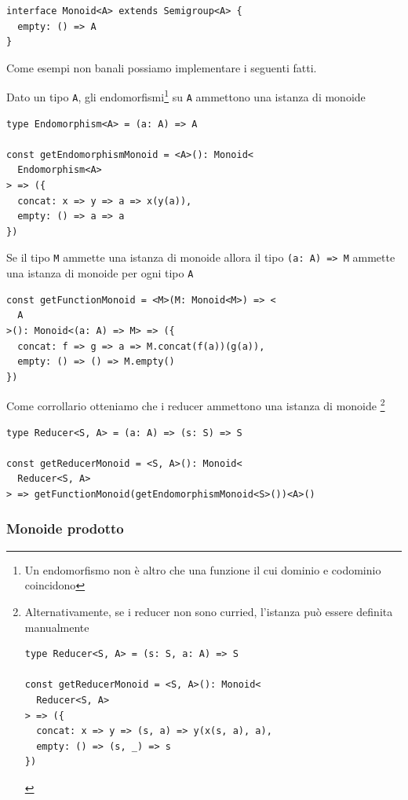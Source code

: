 \documentclass[12pt]{article}
\begin{document}
\begin{verbatim}
interface Monoid<A> extends Semigroup<A> {
  empty: () => A
}
\end{verbatim}

Come esempi non banali possiamo implementare i seguenti fatti.

Dato un tipo \texttt{A}, gli endomorfismi\footnote{Un endomorfismo non è altro che una funzione il cui dominio e codominio coincidono}
su \texttt{A} ammettono una istanza di monoide

\begin{verbatim}
type Endomorphism<A> = (a: A) => A

const getEndomorphismMonoid = <A>(): Monoid<
  Endomorphism<A>
> => ({
  concat: x => y => a => x(y(a)),
  empty: () => a => a
})
\end{verbatim}

Se il tipo \texttt{M} ammette una istanza di monoide allora il tipo \texttt{(a: A) => M} ammette una istanza di monoide per ogni tipo \texttt{A}

\begin{verbatim}
const getFunctionMonoid = <M>(M: Monoid<M>) => <
  A
>(): Monoid<(a: A) => M> => ({
  concat: f => g => a => M.concat(f(a))(g(a)),
  empty: () => () => M.empty()
})
\end{verbatim}

Come corrollario otteniamo che i reducer ammettono una istanza di monoide
\footnote{Alternativamente, se i reducer non sono curried, l'istanza può essere definita manualmente

\begin{verbatim}
type Reducer<S, A> = (s: S, a: A) => S

const getReducerMonoid = <S, A>(): Monoid<
  Reducer<S, A>
> => ({
  concat: x => y => (s, a) => y(x(s, a), a),
  empty: () => (s, _) => s
})
\end{verbatim}

}

\begin{verbatim}
type Reducer<S, A> = (a: A) => (s: S) => S

const getReducerMonoid = <S, A>(): Monoid<
  Reducer<S, A>
> => getFunctionMonoid(getEndomorphismMonoid<S>())<A>()
\end{verbatim}

\subsubsection{Monoide prodotto}
\end{document}
